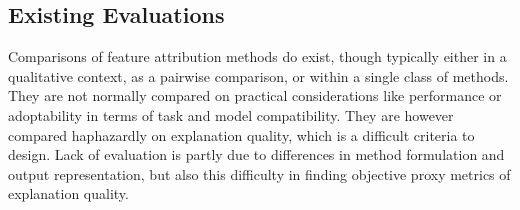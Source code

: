 \documentclass[main]{subfiles}
\begin{document}
\subsection*{Existing Evaluations}

Comparisons of feature attribution methods do exist, though typically either in a qualitative context, as a pairwise comparison, or within a single class of methods. They are not normally compared on practical considerations like performance or adoptability in terms of task and model compatibility. They are however compared haphazardly on explanation quality, which is a difficult criteria to design. Lack of evaluation is partly due to differences in method formulation and output representation, but also this difficulty in finding objective proxy metrics of explanation quality.





\end{document}
